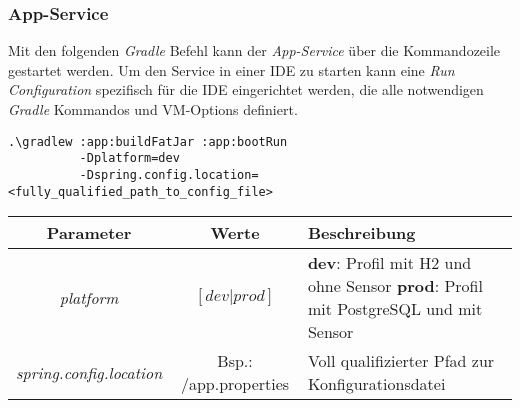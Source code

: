 \documentclass[]{article}
\begin{document}
{{\subsubsection{App-Service}
Mit den folgenden \emph{Gradle} Befehl kann der \emph{App-Service} über die Kommandozeile gestartet werden. Um den Service in einer IDE zu starten kann eine \emph{Run Configuration} spezifisch für die IDE eingerichtet werden, die alle notwendigen \emph{Gradle} Kommandos und VM-Options definiert.
\begin{verbatim}
.\gradlew :app:buildFatJar :app:bootRun
	      -Dplatform=dev              
	      -Dspring.config.location=<fully_qualified_path_to_config_file>
\end{verbatim}
{\renewcommand{\arraystretch}{2}%
\begin{center}
	\begin{tabular}{| c | c | p{8.3cm} |}
		\hline
		\textbf{Parameter} & \textbf{Werte} & \textbf{Beschreibung}  \\ \hline
		\textit{platform} & $[dev|prod]$ & \textbf{dev}: Profil mit H2 und ohne Sensor \newline
		\textbf{prod}: Profil mit PostgreSQL und mit Sensor \\ \hline
		\textit{spring.config.location} & Bsp.: /app.properties & Voll qualifizierter Pfad zur Konfigurationsdatei  \\ \hline
	\end{tabular}
\end{center}

}}}
\end{document}
